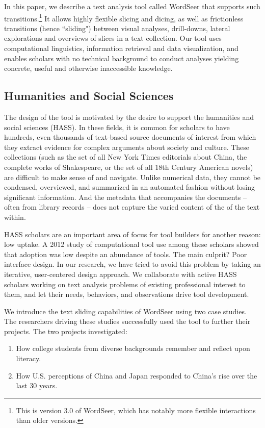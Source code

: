 \documentclass{sig-alternate}
\begin{document}
In this paper, we describe a text analysis tool called WordSeer that supports such transitions.\footnote{This is version 3.0 of WordSeer, which has notably more flexible interactions than older versions.}  It allows highly flexible slicing and dicing, as well as frictionless transitions (hence ``sliding") between visual analyses, drill-downs, lateral explorations and overviews of slices in a text collection. Our tool uses computational linguistics, information retrieval and data visualization, and enables scholars with no technical background to conduct analyses yielding concrete, useful and otherwise inaccessible knowledge. 

\subsection{Humanities and Social Sciences}
The design of the tool is motivated by the desire to support the humanities and social sciences (HASS). In these fields, it is common for scholars to have hundreds, even thousands of text-based source documents of interest from which they extract evidence for complex arguments about society and culture. These collections (such as the set of all New York Times editorials about China, the complete works of Shakespeare, or the set of all 18th Century American novels)  are difficult to make sense of and navigate. Unlike numerical data, they cannot be condensed, overviewed, and summarized in an automated fashion without losing significant information. And the metadata that accompanies the documents -- often from library records -- does not capture the varied content of the of the text within.

HASS scholars are an important area of focus for tool builders for another reason: low uptake. A 2012 study of computational tool use among these scholars showed that adoption was low despite an abundance of tools. The main culprit? Poor interface design. In our research, we have tried to avoid this problem by taking an iterative, user-centered design approach. We collaborate with active HASS scholars working on text analysis problems of existing professional interest to them, and let their needs, behaviors, and observations drive tool development.

We introduce the text sliding capabilities of WordSeer using two case studies. The researchers driving these studies successfully used the tool to further their projects. The two projects investigated:
\begin{enumerate}
	\item How college students from diverse backgrounds remember and reflect upon literacy.
	\item How U.S. perceptions of China and Japan responded to China's rise over the last 30 years.
\end{enumerate}
\end{document}
